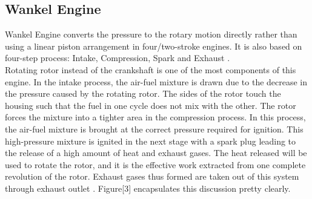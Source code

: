 \documentclass[11pt]{article}
\begin{document}
\subsection{Wankel Engine}

Wankel Engine converts the pressure to the rotary motion directly rather than using a linear piston arrangement in four/two-stroke engines. It is also based on four-step process: Intake, Compression, Spark and Exhaust \cite{ref7}.\\
Rotating rotor instead of the crankshaft is one of the most components of this engine. In the intake process, the air-fuel mixture is drawn due to the decrease in the pressure caused by the rotating rotor. The sides of the rotor touch the housing such that the fuel in one cycle does not mix with the other. The rotor forces the mixture into a tighter area in the compression process. In this process, the air-fuel mixture is brought at the correct pressure required for ignition. This high-pressure mixture is ignited in the next stage with a spark plug leading to the release of a high amount of heat and exhaust gases. The heat released will be used to rotate the rotor, and it is the effective work extracted from one complete revolution of the rotor. Exhaust gases thus formed are taken out of this system through exhaust outlet \cite{ref7}. Figure[3] encapsulates this discussion pretty clearly.
\end{document}
